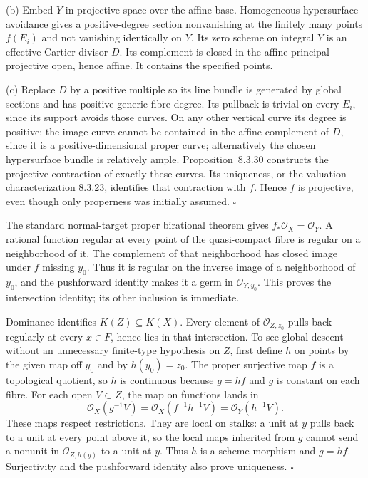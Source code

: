 \documentclass[11pt]{article}
\let\chapterexercise\exercise
\renewcommand{\exercise}[2]{\Needspace{8\baselineskip}\chapterexercise{#1}{#2}}
\begin{document}
(b) Embed $Y$ in projective space over the affine base. Homogeneous hypersurface avoidance gives a positive-degree section nonvanishing at the finitely many points $f(E_i)$ and not vanishing identically on $Y$. Its zero scheme on integral $Y$ is an effective Cartier divisor $D$. Its complement is closed in the affine principal projective open, hence affine. It contains the specified points.

(c) Replace $D$ by a positive multiple so its line bundle is generated by global sections and has positive generic-fibre degree. Its pullback is trivial on every $E_i$, since its support avoids those curves. On any other vertical curve its degree is positive: the image curve cannot be contained in the affine complement of $D$, since it is a positive-dimensional proper curve; alternatively the chosen hypersurface bundle is relatively ample. Proposition~8.3.30 constructs the projective contraction of exactly these curves. Its uniqueness, or the valuation characterization 8.3.23, identifies that contraction with $f$. Hence $f$ is projective, even though only properness was initially assumed. \hfill$\square$

\pf
The standard normal-target proper birational theorem gives $f_*\mathcal O_X=\mathcal O_Y$. A rational function regular at every point of the quasi-compact fibre is regular on a neighborhood of it. The complement of that neighborhood has closed image under $f$ missing $y_0$. Thus it is regular on the inverse image of a neighborhood of $y_0$, and the pushforward identity makes it a germ in $\mathcal O_{Y,y_0}$. This proves the intersection identity; its other inclusion is immediate.

Dominance identifies $K(Z)\subseteq K(X)$. Every element of $\mathcal O_{Z,z_0}$ pulls back regularly at every $x\in F$, hence lies in that intersection. To see global descent without an unnecessary finite-type hypothesis on $Z$, first define $h$ on points by the given map off $y_0$ and by $h(y_0)=z_0$. The proper surjective map $f$ is a topological quotient, so $h$ is continuous because $g=h f$ and $g$ is constant on each fibre. For each open $V\subset Z$, the map on functions lands in
\[ \mathcal O_X(g^{-1}V)=\mathcal O_X(f^{-1}h^{-1}V)=\mathcal O_Y(h^{-1}V). \]
These maps respect restrictions. They are local on stalks: a unit at $y$ pulls back to a unit at every point above it, so the local maps inherited from $g$ cannot send a nonunit in $\mathcal O_{Z,h(y)}$ to a unit at $y$. Thus $h$ is a scheme morphism and $g=hf$. Surjectivity and the pushforward identity also prove uniqueness. \hfill$\square$
\end{document}
